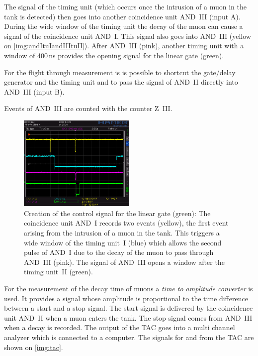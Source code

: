 The signal of the timing unit (which occurs once the intrusion of a muon in the tank is detected)
then goes into another coincidence unit AND~III (input A).
During the wide window of the timing unit the decay of the muon can cause a signal
of the coincidence unit AND~I. This signal also goes into AND~III
(yellow on \autoref{img:andItuIandIIItuII}).
After AND~III (pink),
another timing unit with a window of 400\,ns provides the opening signal for the linear gate (green).

For the flight through measurement is is possible to shortcut the gate/delay generator and the timing unit
and to pass the signal of AND~II directly into AND~III (input B).

Events of AND~III are counted with the counter Z~III.

\begin{figure}[H]
\begin{center}
  \includegraphics[width=0.5\textwidth]{../img/S0010.PNG}
  \caption{Creation of the control signal for the linear gate (green):
  The coincidence unit AND~I records two events (yellow), the first event arising from the intrusion
  of a muon in the tank. This triggers a wide window of the timing unit~I (blue) which
  allows the second pulse of AND~I due to the decay of the muon to pass through AND~III (pink).
  The signal of AND~III opens a window after the timing unit~II (green).}
  \label{img:andItuIandIIItuII}
\end{center}
\end{figure}

For the measurement of the decay time of muons a \emph{time to amplitude converter} is used.
It provides a signal whose amplitude is proportional to the time difference between a start and a stop signal.
The start signal is delivered by the coincidence unit AND~II when a muon enters the tank.
The stop signal comes from AND~III when a decay is recorded.
The output of the TAC goes into a multi channel analyzer which is connected to a computer.
The signals for and from the TAC are shown on \autoref{img:tac}.



